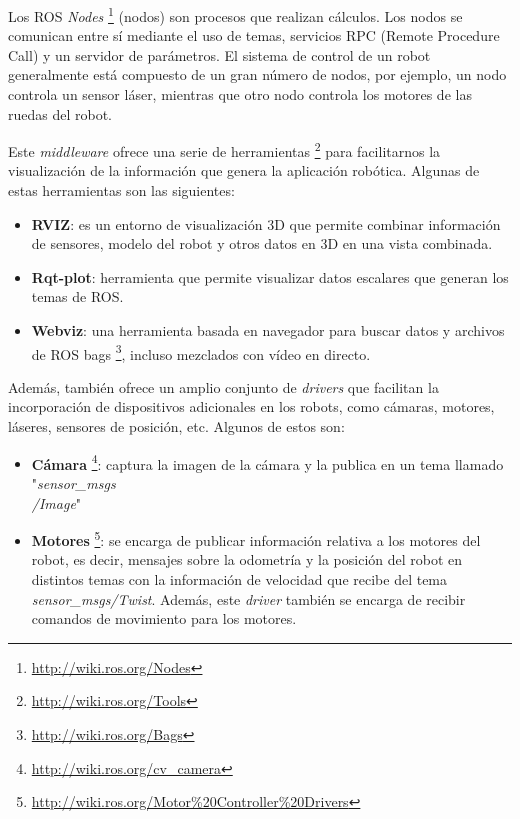\documentclass[a4paper, 12pt]{book}
\begin{document}
Los ROS \emph{Nodes} \footnote{\url{http://wiki.ros.org/Nodes}} (nodos) son procesos que realizan cálculos. Los nodos se comunican entre sí mediante el uso de temas, servicios RPC (Remote Procedure Call) y un servidor de parámetros. El sistema de control de un robot generalmente está compuesto de un gran número de nodos, por ejemplo, un nodo controla un sensor láser, mientras que otro nodo controla los motores de las ruedas del robot.

Este \emph{middleware} ofrece una serie de herramientas \footnote{\url{http://wiki.ros.org/Tools}} para facilitarnos la visualización de la información que genera la aplicación robótica. Algunas de estas herramientas son las siguientes:
\nolinebreak
\begin{itemize}
\itemsep 0em
\item \textbf{RVIZ}: es un entorno de visualización 3D que permite combinar información de sensores, modelo del robot y otros datos en 3D en una vista combinada.
\item \textbf{Rqt-plot}: herramienta que permite visualizar datos escalares que generan los temas de ROS.
\item \textbf{Webviz}: una herramienta basada en navegador para buscar datos y archivos de ROS bags \footnote{\url{http://wiki.ros.org/Bags}}, incluso mezclados con vídeo en directo.
\end{itemize}

Además, también ofrece un amplio conjunto de \emph{drivers} que facilitan la incorporación de dispositivos adicionales en los robots, como cámaras, motores, láseres, sensores de posición, etc. Algunos de estos son:

\begin{itemize}
\itemsep 0em
\item \textbf{Cámara} \footnote{\url{http://wiki.ros.org/cv_camera}}: captura la imagen de la cámara y la publica en un tema llamado "\emph{sensor\_msgs\\/Image}"
\item \textbf{Motores} \footnote{\url{http://wiki.ros.org/Motor\%20Controller\%20Drivers}}: se encarga de publicar información relativa a los motores del robot, es decir, mensajes sobre la odometría y la posición del robot en distintos temas con la información de velocidad que recibe del tema \emph{sensor\_msgs/Twist}. Además, este \emph{driver} también se encarga de recibir comandos de movimiento para los motores.

\end{itemize}
\end{document}
